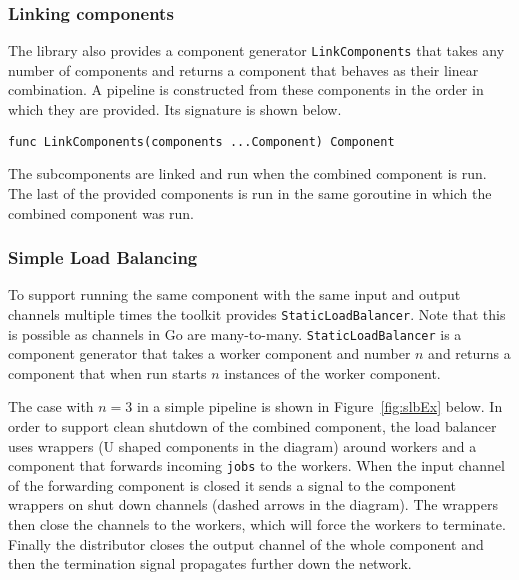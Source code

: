 \subsubsection{Linking components}
The library also provides a component generator \texttt{LinkComponents} that takes 
any number of components and returns a component that behaves as their 
linear combination. A pipeline is constructed from these components 
in the order in which they are provided. Its signature is shown below.
\begin{lstlisting}
func LinkComponents(components ...Component) Component
\end{lstlisting}
The subcomponents are linked and run when the combined component is run. 
The last of the provided components is run in the same goroutine in which
the combined component was run.

\subsubsection{Simple Load Balancing}
To support running the same component with the same input and output 
channels multiple times the toolkit provides \texttt{StaticLoadBalancer}.
Note that this is possible as channels in Go are many-to-many.
\texttt{StaticLoadBalancer} is a component generator that takes a worker 
component and number $n$ and returns a component that when run starts 
$n$ instances of the worker component. 

The case with $n=3$ in a simple pipeline is shown in Figure~\ref{fig:slbEx} below. 
In order to support clean shutdown of the combined component, the load balancer uses 
wrappers (U shaped components in the diagram) around workers and a component that 
forwards incoming \texttt{jobs} to the workers. When the input channel of the 
forwarding
component is closed it sends a signal to the component wrappers on shut 
down channels (dashed arrows in the diagram). The wrappers then close
the channels to the workers, which will force the workers to terminate.
Finally the distributor closes the output channel of the whole component
and then the termination signal propagates further down the network.

